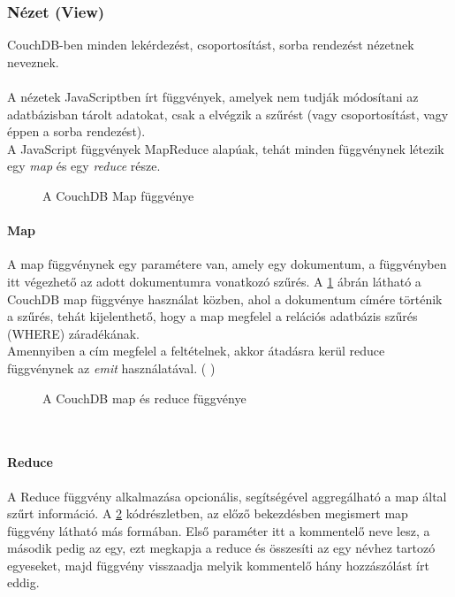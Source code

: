 		\subsubsection{Nézet (View)}
			\label{subsect:couchdbview}
			CouchDB-ben minden lekérdezést, csoportosítást, sorba rendezést nézetnek neveznek. \hfill\\
			\\
			A nézetek JavaScriptben írt függvények, amelyek nem tudják módosítani az adatbázisban tárolt adatokat, csak a elvégzik a szűrést (vagy csoportosítást, vagy éppen a sorba rendezést).\hfill\\
			A JavaScript függvények MapReduce alapúak, tehát minden függvénynek létezik egy \emph{map} és egy \emph{reduce} része. 
			\\
			\begin{figure}[ht]
				\centering
					
					\caption{A CouchDB Map függvénye}
					\label{fig:couchdb_map}
			\end{figure}

			\paragraph{\bf Map}
				A map függvénynek egy paramétere van, amely egy dokumentum, a függvényben itt végezhető az adott dokumentumra vonatkozó szűrés. A \ref{fig:couchdb_map} ábrán látható a CouchDB map függvénye használat közben, ahol a dokumentum címére történik a szűrés, tehát kijelenthető, hogy a map megfelel a relációs adatbázis szűrés (WHERE) záradékának.\\
				Amennyiben a cím megfelel a feltételnek, akkor átadásra kerül reduce függvénynek az \emph{emit} használatával. ( )

			\begin{figure}[ht]
				\centering
					
					\caption{A CouchDB map és reduce függvénye}
					\label{fig:couchdb_map_expr}
			\end{figure}
			\hfill\\
			\paragraph{\bf Reduce}
				A Reduce függvény alkalmazása opcionális, segítségével aggregálható a map által szűrt információ. A \ref{fig:couchdb_map_expr} kódrészletben, az előző bekezdésben megismert map függvény látható más formában. Első paraméter itt a kommentelő neve lesz, a második pedig az egy, ezt megkapja a reduce és összesíti az egy névhez tartozó egyeseket, majd függvény visszaadja melyik kommentelő hány hozzászólást írt eddig.
		\hfill\\

